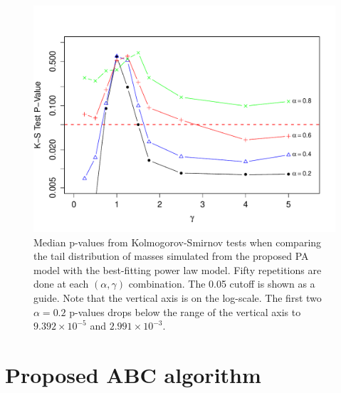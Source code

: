 \documentclass[ejs]{imsart}
\numberwithin{equation}{section}
\theoremstyle{plain}
\newcommand{\jessi}[1]{{\color{blue}[[\textbf{Jessi: }#1]]}}
\begin{document}

\begin{figure}[htbp]
   \centering
\includegraphics[width = \textwidth]{figures/KSpowerlaw_1000_1.pdf}
\caption{Median p-values from Kolmogorov-Smirnov tests when comparing the tail distribution of masses simulated from
the proposed PA model with the best-fitting power law model. Fifty repetitions are done at each $(\alpha, \gamma)$
combination. The 0.05 cutoff is shown as a guide. Note that the vertical axis is on the log-scale.
The first two $\alpha = 0.2$ p-values drops below the range of the vertical axis to $9.392\times10^{-5}$ and $2.991\times10^{-3}$.
}
   \label{fig:KSpowerlaw1000}
\end{figure}





\section{Proposed ABC algorithm} \label{methodSec:abc}
\end{document}
